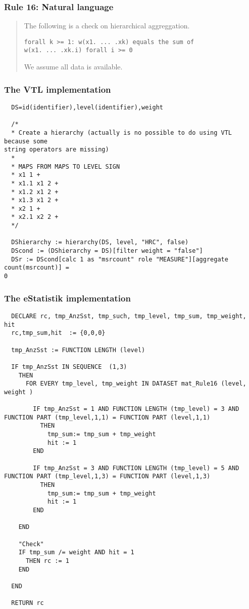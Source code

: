 \newpage

\subsubsection*{  Rule 16: Natural language}
\begin{quote}


The following is a check on hierarchical aggreggation.

\begin{verbatim}
forall k >= 1: w(x1. ... .xk) equals the sum of
w(x1. ... .xk.i) forall i >= 0
\end{verbatim}

We assume all data is available.



\end{quote}
\subsubsection*{The VTL implementation}
\begin{verbatim}
  DS=id(identifier),level(identifier),weight

  /*
  * Create a hierarchy (actually is no possible to do using VTL because some
string operators are missing)
  *
  * MAPS FROM MAPS TO LEVEL SIGN
  * x1 1 +
  * x1.1 x1 2 +
  * x1.2 x1 2 +
  * x1.3 x1 2 +
  * x2 1 +
  * x2.1 x2 2 +
  */

  DShierarchy := hierarchy(DS, level, "HRC", false)
  DScond := (DShierarchy = DS)[filter weight = "false"]
  DSr := DScond[calc 1 as "msrcount" role "MEASURE"][aggregate count(msrcount)] =
0
\end{verbatim}
\subsubsection*{The eStatistik implementation}
\begin{verbatim}
  DECLARE rc, tmp_AnzSst, tmp_such, tmp_level, tmp_sum, tmp_weight, hit
  rc,tmp_sum,hit  := {0,0,0}

  tmp_AnzSst := FUNCTION LENGTH (level)

  IF tmp_AnzSst IN SEQUENCE  (1,3)
    THEN 
      FOR EVERY tmp_level, tmp_weight IN DATASET mat_Rule16 (level, weight )

        IF tmp_AnzSst = 1 AND FUNCTION LENGTH (tmp_level) = 3 AND FUNCTION PART (tmp_level,1,1) = FUNCTION PART (level,1,1) 
          THEN
            tmp_sum:= tmp_sum + tmp_weight  
            hit := 1
        END

        IF tmp_AnzSst = 3 AND FUNCTION LENGTH (tmp_level) = 5 AND FUNCTION PART (tmp_level,1,3) = FUNCTION PART (level,1,3) 
          THEN
            tmp_sum:= tmp_sum + tmp_weight  
            hit := 1
        END

    END

    "Check"
    IF tmp_sum /= weight AND hit = 1
      THEN rc := 1
    END

  END

  RETURN rc
\end{verbatim}
